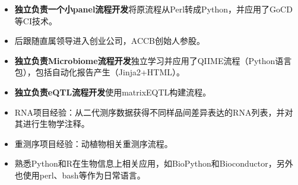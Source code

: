 \documentclass{resume}
\begin{document}
\begin{itemize}
  \item \textbf{独立负责一个小panel流程开发}将原流程从Perl转成Python，并应用了GoCD等CI技术。
  \item 后跟随直属领导进入创业公司，ACCB创始人参股。
\end{itemize}

\begin{itemize}
  \item \textbf{独立负责Microbiome流程开发}独立学习并应用了QIIME流程（Python语言包），包括自动化报告产生（Jinja2+HTML）。
\end{itemize}

\begin{itemize}
  \item \textbf{独立负责eQTL流程开发}使用matrixEQTL构建流程。
  \item RNA项目经验：从二代测序数据获得不同样品间差异表达的RNA列表，并对其进行生物学注释。
  \item 重测序项目经验：动植物相关重测序流程。
  \item 熟悉Python和R在生物信息上相关应用，如BioPython和Bioconductor，另外也使用perl、bash等作为日常语言。
\end{itemize}



\end{document}
